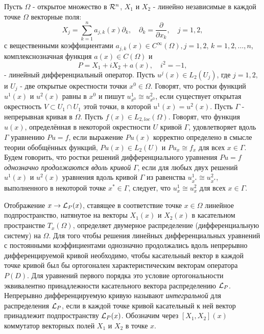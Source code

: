 


\vzmscaption


Пусть $ \Omega$ - открытое множество в ${\cal R}^n$, $X_1$ и $X_2$ - линейно независимые в каждой точке $ \Omega$ векторные поля:
$$
X_j=\sum_{k=1}^na_{j, k}(x)\partial_k,\quad \partial_k=\frac{\partial}{\partial x_k},\quad j=1,2,
$$
с вещественными  коэффициентами $a_{j,k}(x)\in C^{\infty}(\Omega), j=1,2$, $k=1, 2,\dots, n$, комплекснозначная  функция $a(x)\in C(\Omega)$ и
$$
P=X_1+iX_2+a(x), \quad i^2=-1,
$$
- линейный дифференциальный оператор. Пусть $u^j(x)\in L_{2}(U_j)$, где $j=1, 2,$ и $U_j$ - две открытые окрестности точки  $x^0\in \Omega$. Говорят, что ростки  функций $u^1(x)$ и  $u^2(x)$  равны в $x^0$ и пишут  $u_{x^0}^1\cong u_{x^0}^2$, если существует открытая окрестность $V\subset U_1\cap U_1$ этой точки, в которой $u^1(x)=u^2(x)$. Пусть $\Gamma$ - непрерывная кривая в $ \Omega$. Пусть $f(x)\in L_{2, loc}(\Omega)$. Говорят, что функция $u(x)$, определённая в некоторой окрестности $U$ кривой $\Gamma$,  удовлетворяет вдоль $\Gamma$
 уравнению $Pu=f$, если выражение $Pu(x)$ корректно определено в смысле теории обобщённых функций, $Pu(x)\in L_{2}(U)$ и  $Pu_x\cong f_x$ для всех $x\in\Gamma$.
Будем говорить, что ростки решений дифференциального уравнения
$
Pu=f
$
{\it однозначно продолжаются вдоль кривой} $\Gamma$, если для любых двух решений $u^1(x)$ и $u^2(x)$ уравнения вдоль кривой $\Gamma$  из равенства $u^1_{x^{\ast}}\cong u^2_{x^{\ast}}$, выполненного в некоторой точке $x^{\ast}\in\Gamma$,   следует, что $u^1_x\cong u^2_x$ для всех $x\in\Gamma$.

Отображение $x\to {\cal L}_P(x)$, ставящее в соответствие точке $x\in \Omega$
линейное подпространство, натянутое на векторы $X_1(x)$ и $X_2(x)$ в касательном пространстве  $T_x(\Omega)$, определяет двумерное  распределение (дифференциальную систему) на $\Omega$.
Для того чтобы решения линейных дифференциальных уравнений с постоянными коэффициентами
однозначно продолжались вдоль непрерывно дифференцируемой кривой необходимо, чтобы касательный вектор в каждой точке кривой был бы ортогонален характеристическим векторам оператора $P(D)$. Для уравнений первого порядка это условие ортогональности эквивалентно принадлежности касательного вектора распределению ${\cal L}_P$.
Непрерывно дифференцируемую кривую называют {\it интегральной}  для распределения ${\cal L}_P$, если в каждой точке  кривой
касательный  к ней  вектор принадлежит подпространству ${\cal L}_P(x)$.
Обозначим через $[X_1, X_2](x)$ коммутатор векторных полей $X_1$ и $X_2$ в точке $x$.

